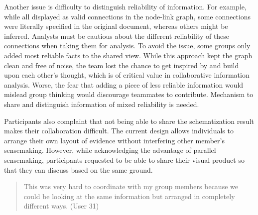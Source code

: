 Another issue is difficulty to distinguish reliability of information. For example, while all displayed as valid connections in the node-link graph, some connections were literally specified in the original document, whereas others might be inferred. Analysts must be cautious about the different reliability of these connections when taking them for analysis. To avoid the issue, some groups only added most reliable facts to the shared view. While this approach kept the graph clean and free of noise, the team lost the chance to get inspired by and build upon each other's thought, which is of critical value in collaborative information analysis. Worse, the fear that adding a piece of less reliable information would mislead group thinking would discourage teammates to contribute. Mechanism to share and distinguish information of mixed reliability is needed.


Participants also complaint that not being able to share the schematization result makes their collaboration difficult. The current design allows individuals to arrange their own layout of evidence without interfering other member's sensemaking. However, while acknowledging the advantage of parallel sensemaking, participants requested to be able to share their visual product so that they can discuss based on the same ground.

\begin{quote}
	This was very hard to coordinate with my group members because we could be looking at the same information but arranged in completely different ways. (User 31)
\end{quote}

